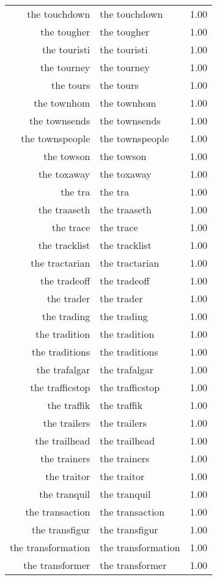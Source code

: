 \begin{table}[ht]
\begin{tabular}{rlr}
  the touchdown & the touchdown & 1.00 \\ 
  the tougher & the tougher & 1.00 \\ 
  the touristi & the touristi & 1.00 \\ 
  the tourney & the tourney & 1.00 \\ 
  the tours & the tours & 1.00 \\ 
  the townhom & the townhom & 1.00 \\ 
  the townsends & the townsends & 1.00 \\ 
  the townspeople & the townspeople & 1.00 \\ 
  the towson & the towson & 1.00 \\ 
  the toxaway & the toxaway & 1.00 \\ 
  the tra & the tra & 1.00 \\ 
  the traaseth & the traaseth & 1.00 \\ 
  the trace & the trace & 1.00 \\ 
  the tracklist & the tracklist & 1.00 \\ 
  the tractarian & the tractarian & 1.00 \\ 
  the tradeoff & the tradeoff & 1.00 \\ 
  the trader & the trader & 1.00 \\ 
  the trading & the trading & 1.00 \\ 
  the tradition & the tradition & 1.00 \\ 
  the traditions & the traditions & 1.00 \\ 
  the trafalgar & the trafalgar & 1.00 \\ 
  the trafficstop & the trafficstop & 1.00 \\ 
  the traffik & the traffik & 1.00 \\ 
  the trailers & the trailers & 1.00 \\ 
  the trailhead & the trailhead & 1.00 \\ 
  the trainers & the trainers & 1.00 \\ 
  the traitor & the traitor & 1.00 \\ 
  the tranquil & the tranquil & 1.00 \\ 
  the transaction & the transaction & 1.00 \\ 
  the transfigur & the transfigur & 1.00 \\ 
  the transformation & the transformation & 1.00 \\ 
  the transformer & the transformer & 1.00 \\ 

\end{tabular}
\end{table}

